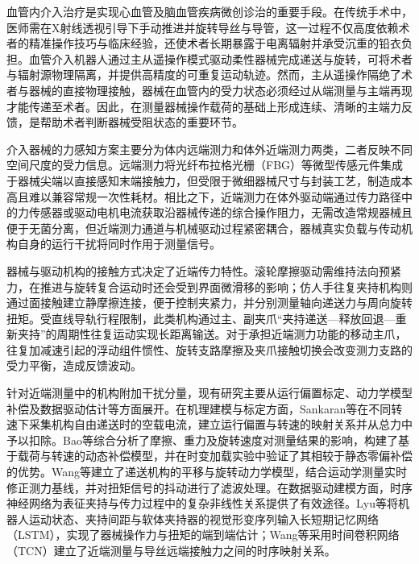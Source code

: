 \documentclass{JQRnew}
\begin{document}
\maketitle

血管内介入治疗是实现心血管及脑血管疾病微创诊治的重要手段。在传统手术中，医师需在X射线透视引导下手动推进并旋转导丝与导管，这一过程不仅高度依赖术者的精准操作技巧与临床经验，还使术者长期暴露于电离辐射并承受沉重的铅衣负担。血管介入机器人通过主从遥操作模式驱动柔性器械完成递送与旋转，可将术者与辐射源物理隔离，并提供高精度的可重复运动轨迹。然而，主从遥操作隔绝了术者与器械的直接物理接触，器械在血管内的受力状态必须经过从端测量与主端再现才能传递至术者。因此，在测量器械操作载荷的基础上形成连续、清晰的主端力反馈，是帮助术者判断器械受阻状态的重要环节。

介入器械的力感知方案主要分为体内远端测力和体外近端测力两类，二者反映不同空间尺度的受力信息。远端测力将光纤布拉格光栅（FBG）等微型传感元件集成于器械尖端以直接感知末端接触力，但受限于微细器械尺寸与封装工艺，制造成本高且难以兼容常规一次性耗材。相比之下，近端测力在体外驱动端通过传力路径中的力传感器或驱动电机电流获取沿器械传递的综合操作阻力，无需改造常规器械且便于无菌分离，但近端测力通道与机械驱动过程紧密耦合，器械真实负载与传动机构自身的运行干扰将同时作用于测量信号。

器械与驱动机构的接触方式决定了近端传力特性。滚轮摩擦驱动需维持法向预紧力，在推进与旋转复合运动时还会受到界面微滑移的影响；仿人手往复夹持机构则通过面接触建立静摩擦连接，便于控制夹紧力，并分别测量轴向递送力与周向旋转扭矩。受直线导轨行程限制，此类机构通过主、副夹爪“夹持递送---释放回退---重新夹持”的周期性往复运动实现长距离输送。对于承担近端测力功能的移动主爪，往复加减速引起的浮动组件惯性、旋转支路摩擦及夹爪接触切换会改变测力支路的受力平衡，造成反馈波动。

针对近端测量中的机构附加干扰分量，现有研究主要从运行偏置标定、动力学模型补偿及数据驱动估计等方面展开。在机理建模与标定方面，Sankaran等在不同转速下采集机构自由递送时的空载电流，建立运行偏置与转速的映射关系并从总力中予以扣除。Bao等综合分析了摩擦、重力及旋转速度对测量结果的影响，构建了基于载荷与转速的动态补偿模型，并在时变加载实验中验证了其相较于静态零偏补偿的优势。Wang等建立了递送机构的平移与旋转动力学模型，结合运动学测量实时修正测力基线，并对扭矩信号的抖动进行了滤波处理。在数据驱动建模方面，时序神经网络为表征夹持与传力过程中的复杂非线性关系提供了有效途径。Lyu等将机器人运动状态、夹持间距与软体夹持器的视觉形变序列输入长短期记忆网络（LSTM），实现了器械操作力与扭矩的端到端估计；Wang等采用时间卷积网络（TCN）建立了近端测量与导丝远端接触力之间的时序映射关系。
\end{document}
